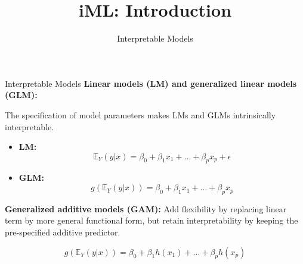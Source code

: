 \documentclass[aspectratio=169]{../latex_main/tntbeamer}  %
\title[Introduction]{iML: Introduction}
\subtitle{Interpretable Models}
\begin{document}
	
	\maketitle

\begin{frame}{Interpretable Models}
	\textbf{Linear models (LM) and generalized linear models (GLM):}
	
	The specification of model parameters makes LMs and GLMs intrinsically interpretable.
	
	\begin{itemize}
		
		\item \textbf{LM:}
		$$
		\mathbb{E}_Y(y \vert x) = \beta_0 + \beta_1 x_1 + \dots + \beta_p x_p + \epsilon
		$$
		
		\item \textbf{GLM:}
		$$
		g\left(\mathbb{E}_Y(y \vert x)\right) = \beta_0 + \beta_1 x_1 + \dots + \beta_p x_p
		$$
	\end{itemize}
	
	\pause
	\textbf{Generalized additive models (GAM):} Add flexibility by replacing linear term by more general functional form, but retain interpretability by keeping the pre-specified additive predictor.
	
	$$
	g\left(\mathbb{E}_Y(y \vert x)\right) = \beta_0 + \beta_1 h(x_1) + \dots + \beta_p h(x_p)
	$$
	
\end{frame}
\end{document}
